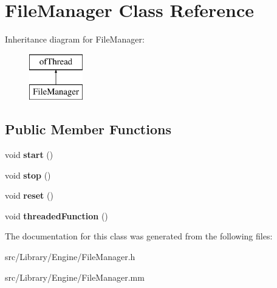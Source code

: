 \hypertarget{class_file_manager}{}\section{File\+Manager Class Reference}
\label{class_file_manager}
Inheritance diagram for File\+Manager\+:\begin{figure}[H]
\begin{center}
\leavevmode
\includegraphics[height=2.000000cm]{class_file_manager}
\end{center}
\end{figure}
\subsection*{Public Member Functions}
\begin{DoxyCompactItemize}
\item 
\mbox{\label{class_file_manager_a62d032b875c7f4d9fd8dd63366c84ac4}} 
void {\bfseries start} ()
\item 
\mbox{\label{class_file_manager_acaab8093e052afae216f8436af2f283e}} 
void {\bfseries stop} ()
\item 
\mbox{\label{class_file_manager_a96ba4b1661fc67fcb71de944002c1ce5}} 
void {\bfseries reset} ()
\item 
\mbox{\label{class_file_manager_aee35ffdb32676b67f49f133cf0155b04}} 
void {\bfseries threaded\+Function} ()
\end{DoxyCompactItemize}


The documentation for this class was generated from the following files\+:\begin{DoxyCompactItemize}
\item 
src/\+Library/\+Engine/File\+Manager.\+h\item 
src/\+Library/\+Engine/File\+Manager.\+mm\end{DoxyCompactItemize}
